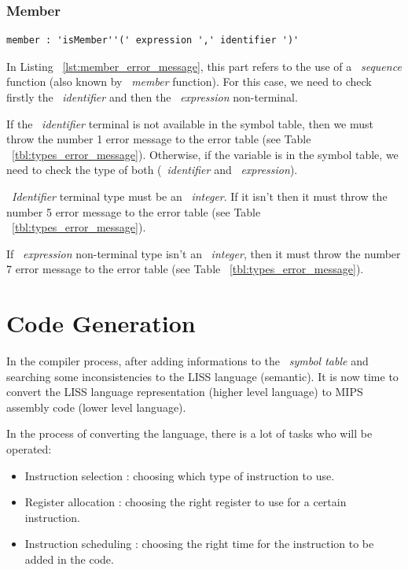 \documentclass[
  oneside,
  11pt, a4paper,
  footinclude=true,
  headinclude=true,
  cleardoublepage=empty
]{scrbook}
\begin{document}
\subsubsection{Member}

\begin{lstlisting}[caption={Member rule in LISS},label={lst:member_error_message}]
  member : 'isMember''(' expression ',' identifier ')'
\end{lstlisting}

In Listing ~\ref{lst:member_error_message}, this part refers to the use of a ~\textit{sequence} function (also known by ~\textit{member} function).
For this case, we need to check firstly the ~\textit{identifier} and then the ~\textit{expression} non-terminal.

If the ~\textit{identifier} terminal is not available in the symbol table, then we must throw the number 1 error message to the error table (see Table ~\ref{tbl:types_error_message}).
Otherwise, if the variable is in the symbol table, we need to check the type of both (~\textit{identifier} and ~\textit{expression}).

~\textit{Identifier} terminal type must be an ~\textit{integer}. If it isn't then it must throw the number 5 error message to the error table (see Table ~\ref{tbl:types_error_message}).

If ~\textit{expression} non-terminal type isn't an ~\textit{integer}, then it must throw the number 7 error message to the error table (see Table ~\ref{tbl:types_error_message}).



\section{Code Generation}
\label{sct:code_generation}

In the compiler process, after adding informations to the ~\textit{symbol table} and searching some inconsistencies to the LISS language (semantic). It is now time to convert the LISS language representation (higher level language) to MIPS assembly code (lower level language).

In the process of converting the language, there is a lot of tasks who will be operated:

\begin{itemize}
\item Instruction selection : choosing which type of instruction to use.
\item Register allocation : choosing the right register to use for a certain instruction.
\item Instruction scheduling : choosing the right time for the instruction to be added in the code.
\end{itemize}
\end{document}
